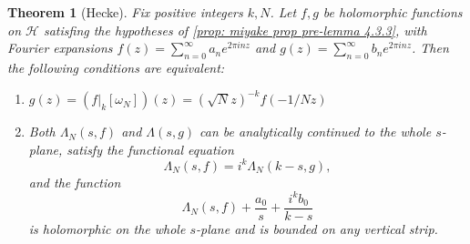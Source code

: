 \documentclass[10pt,leqno,twoside]{article}
\theoremstyle{plain}
\newtheorem{theorem}[lem]{Theorem}
\theoremstyle{definition}
\numberwithin{equation}{section}
\numberwithin{lem}{section}
\begin{document}
\begin{theorem}[Hecke]\label{thm: miyake thm 4.3.6}
    Fix positive integers $k,N$. Let $f,g$ be holomorphic functions on $\mathcal H$ satisfing the hypotheses of \cref{prop: miyake prop pre-lemma 4.3.3}, with Fourier expansions $f(z) = \sum_{n=0}^\infty a_ne^{2\pi i nz}$ and $g(z) = \sum_{n=0}^\infty b_ne^{2\pi i nz}$. Then the following conditions are equivalent: 
    \begin{enumerate}[label = \textup{(\alph*)}]
        \item $g(z) = (f|_k[\omega_N])(z) = (\sqrt{N}z)^{-k}f(-1/Nz)$
        \item Both $\varLambda_N(s,f)$ and $\varLambda(s,g)$ can be analytically continued to the whole $s$-plane, satisfy the functional equation \[\varLambda_N(s,f) = i^k\varLambda_N(k-s,g),\] and the function \[\varLambda_N(s,f) + \frac{a_0}{s} + \frac{i^kb_0}{k-s}\] is holomorphic on the whole $s$-plane and is bounded on any vertical strip.
    \end{enumerate}
\end{theorem}
\end{document}
